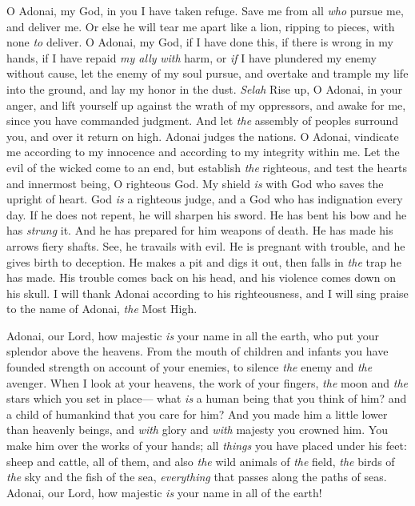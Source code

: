 \begin{biblechapter} %
 O Adonai, my God, in you I have taken refuge. 
Save me from all \textit{who} pursue me, and deliver me.
\verse Or else he will tear me apart like a lion, 
ripping to pieces, with none \textit{to} deliver.
\verse O Adonai, my God, if I have done this, 
if there is wrong in my hands,
\verse if I have repaid \textit{my ally} \textit{with} harm, 
or \textit{if} I have plundered my enemy without cause,
\verse let the enemy of my soul pursue, 
and overtake and trample my life into the ground, 
and lay my honor in the dust. \textit{Selah}
\verse Rise up, O Adonai, in your anger, 
and lift yourself up against the wrath of my oppressors, 
and awake for me, 
since you have commanded judgment.
\verse And let \textit{the} assembly of peoples surround you, 
and over it return on high.
\verse Adonai judges the nations. 
O Adonai, vindicate me 
according to my innocence and according to my integrity within me.
\verse Let the evil of the wicked come to an end, 
but establish \textit{the} righteous, 
and test the hearts and innermost being, O righteous God.
\verse My shield \textit{is} with God 
who saves the upright of heart.
\verse God \textit{is} a righteous judge, 
and a God who has indignation every day.
\verse If he does not repent, he will sharpen his sword. 
He has bent his bow and he has \textit{strung} it.
\verse And he has prepared for him weapons of death. 
He has made his arrows fiery shafts.
\verse See, he travails with evil. 
He is pregnant with trouble, 
and he gives birth to deception.
\verse He makes a pit and digs it out, 
then falls in \textit{the} trap he has made.
\verse His trouble comes back on his head, 
and his violence comes down on his skull.
\verse I will thank Adonai according to his righteousness, 
and I will sing praise to the name of Adonai, \textit{the} Most High.
\end{biblechapter}

\begin{biblechapter} %
 Adonai, our Lord, how majestic \textit{is} your name in all the earth, 
who put your splendor above the heavens.
\verse From the mouth of children and infants you have founded strength 
on account of your enemies, 
to silence \textit{the} enemy and \textit{the} avenger.
\verse When I look at your heavens, the work of your fingers, 
\textit{the} moon and \textit{the} stars which you set in place—
\verse what \textit{is} a human being that you think of him? 
and a child of humankind that you care for him?
\verse And you made him a little lower than heavenly beings, 
and \textit{with} glory and \textit{with} majesty you crowned him.
\verse You make him over the works of your hands; 
all \textit{things} you have placed under his feet:
\verse sheep and cattle, all of them, 
and also \textit{the} wild animals of \textit{the} field,
\verse \textit{the} birds of \textit{the} sky and the fish of the sea, 
\textit{everything} that passes along the paths of seas.
\verse Adonai, our Lord, 
how majestic \textit{is} your name in all of the earth!
\end{biblechapter}

